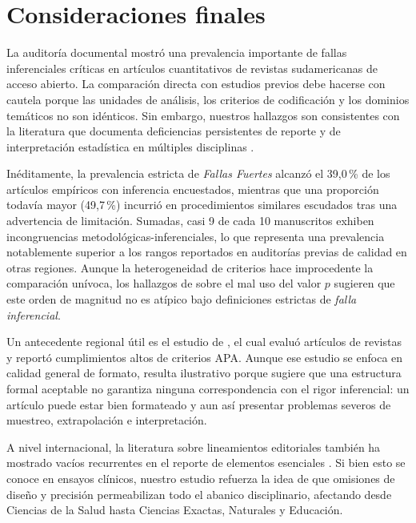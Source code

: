 \section{Consideraciones finales}
\label{sec:consideraciones}

La auditoría documental mostró una prevalencia importante de fallas inferenciales críticas en artículos cuantitativos de revistas sudamericanas de acceso abierto. La comparación directa con estudios previos debe hacerse con cautela porque las unidades de análisis, los criterios de codificación y los dominios temáticos no son idénticos. Sin embargo, nuestros hallazgos son consistentes con la literatura que documenta deficiencias persistentes de reporte y de interpretación estadística en múltiples disciplinas \citep{ioannidis2005,darrigo2024,schmidt2025}.

Inéditamente, la prevalencia estricta de \textit{Fallas Fuertes} alcanzó el 39,0\,\% de los artículos empíricos con inferencia encuestados, mientras que una proporción todavía mayor (49,7\,\%) incurrió en procedimientos similares escudados tras una advertencia de limitación. Sumadas, casi 9 de cada 10 manuscritos exhiben incongruencias metodológicas-inferenciales, lo que representa una prevalencia notablemente superior a los rangos reportados en auditorías previas de calidad en otras regiones. Aunque la heterogeneidad de criterios hace improcedente la comparación unívoca, los hallazgos de \citet{schmidt2025} sobre el mal uso del valor $p$ sugieren que este orden de magnitud no es atípico bajo definiciones estrictas de \textit{falla inferencial}.

Un antecedente regional útil es el estudio de \citet{peralta2023}, el cual evaluó artículos de revistas y reportó cumplimientos altos de criterios APA. Aunque ese estudio se enfoca en calidad general de formato, resulta ilustrativo porque sugiere que una estructura formal aceptable no garantiza ninguna correspondencia con el rigor inferencial: un artículo puede estar bien formateado y aun así presentar problemas severos de muestreo, extrapolación e interpretación.

A nivel internacional, la literatura sobre lineamientos editoriales también ha mostrado vacíos recurrentes en el reporte de elementos esenciales \citep{schulz2010}. Si bien esto se conoce en ensayos clínicos, nuestro estudio refuerza la idea de que omisiones de diseño y precisión permeabilizan todo el abanico disciplinario, afectando desde Ciencias de la Salud hasta Ciencias Exactas, Naturales y Educación.

